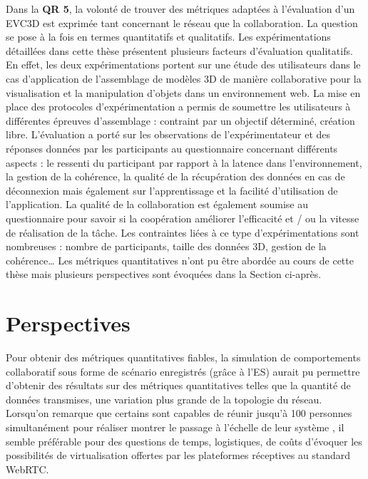 %
Dans la \textbf{QR 5}, la volonté de trouver des métriques adaptées à l'évaluation 
d'un \gls{EVC3D} est exprimée tant concernant le réseau que la collaboration. La 
question se pose à la fois en termes quantitatifs et qualitatifs.
Les expérimentations détaillées dans cette thèse présentent plusieurs facteurs 
d'évaluation qualitatifs. En effet, les deux expérimentations portent sur une étude 
des utilisateurs dans le cas d'application de l'assemblage de modèles 3D de 
manière collaborative pour la visualisation et la manipulation d'objets dans un 
environnement web.
La mise en place des protocoles d'expérimentation a permis de soumettre les 
utilisateurs à différentes épreuves d'assemblage : contraint par un objectif 
déterminé, création libre. 
L'évaluation a porté sur les observations de l'expérimentateur et des réponses 
données par les participants au questionnaire concernant différents aspects : le 
ressenti du participant par rapport à la latence dans l'environnement, la gestion de 
la cohérence, la qualité de la récupération des données en cas de déconnexion 
mais également sur l'apprentissage et la facilité d'utilisation de l'application. La 
qualité de la collaboration est également soumise au questionnaire pour savoir si 
la coopération améliorer l'efficacité et / ou la vitesse de réalisation de la tâche.
Les contraintes liées à ce type d'expérimentations sont nombreuses : nombre de 
participants, taille des données 3D, gestion de la cohérence\dots 
Les métriques quantitatives n'ont pu être abordée au cours de cette thèse mais 
plusieurs perspectives sont évoquées dans la Section  ci-après.


\section{Perspectives}

Pour obtenir des métriques quantitatives fiables, la simulation de comportements 
collaboratif sous forme de scénario enregistrés (grâce à l'\gls{ES}) aurait pu 
permettre d'obtenir 
des résultats sur des métriques quantitatives telles que la quantité de données 
transmises, une variation plus grande de la topologie du réseau. Lorsqu'on 
remarque que certains sont capables de réunir jusqu'à 100 personnes 
simultanément pour réaliser montrer le passage à l'échelle de leur système 
\cite{Hu2017}, il semble préférable pour des questions de temps, logistiques, de 
coûts d'évoquer les possibilités de virtualisation offertes par les plateformes 
réceptives au standard WebRTC.